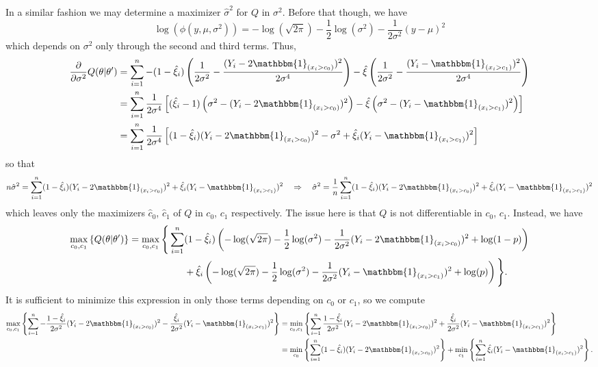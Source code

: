 \documentclass[10pt]{article}
\newcommand{\bp}[1]{\left({#1}\right)}
\newcommand{\1}[1]{\mathbbm{1}_{#1}}
\begin{document}
In a similar fashion we may determine a maximizer $\hat{\sigma}^2$ for $Q$ in $\sigma^2$. Before that though, we have 
\[\log(\phi(y,\mu,\sigma^2))=-\log(\sqrt{2\pi})-\frac{1}{2}\log(\sigma^2)-\frac{1}{2\sigma^2}(y-\mu)^2\]
which depends on $\sigma^2$ only through the second and third terms. Thus,
\begin{align*}
    \frac{\partial}{\partial\sigma^2}Q(\theta|\theta^\prime)&=\sum_{i=1}^n-(1-\hat{\xi}_i)\bp{\frac{1}{2\sigma^2}-\frac{(Y_i-2\mathbbm{1}_{(x_i>c_0)})^2}{2\sigma^4}}-\hat{\xi}\bp{\frac{1}{2\sigma^2}-\frac{(Y_i-\mathbbm{1}_{(x_i>c_1)})^2}{2\sigma^4}}\\
    &=\sum_{i=1}^n\frac{1}{2\sigma^4}\left[(\hat{\xi}_i-1)\bp{\sigma^2-(Y_i-2\mathbbm{1}_{(x_i>c_0)})^2}-\hat{\xi}\bp{\sigma^2-(Y_i-\mathbbm{1}_{(x_i>c_1)})^2}\right]\\
    &=\sum_{i=1}^n\frac{1}{2\sigma^4}\left[(1-\hat{\xi}_i)(Y_i-2\mathbbm{1}_{(x_i>c_0)})^2-\sigma^2+\hat{\xi}_i(Y_i-\mathbbm{1}_{(x_i>c_1)})^2\right]
\end{align*}
so that
\begin{align*}
    n\hat{\sigma}^2=\sum_{i=1}^n(1-\hat{\xi}_i)(Y_i-2\mathbbm{1}_{(x_i>c_0)})^2+\hat{\xi}_i(Y_i-\mathbbm{1}_{(x_i>c_1)})^2\quad\Rightarrow\quad\hat{\sigma}^2=\frac{1}{n}\sum_{i=1}^n(1-\hat{\xi}_i)(Y_i-2\mathbbm{1}_{(x_i>c_0)})^2+\hat{\xi}_i(Y_i-\mathbbm{1}_{(x_i>c_1)})^2
\end{align*}
which leaves only the maximizers $\hat{c}_0$, $\hat{c}_1$ of $Q$ in $c_0$, $c_1$ respectively. The issue here is that $Q$ is not differentiable in $c_0$, $c_1$. Instead, we have
\begin{align*}
    \max_{c_0,c_1}\left\{Q(\theta|\theta^\prime)\right\}=\max_{c_0,c_1}\Bigg\{\sum_{i=1}^n&(1-\hat{\xi}_i)\bp{-\log(\sqrt{2\pi})-\frac{1}{2}\log(\sigma^2)-\frac{1}{2\sigma^2}(Y_i-2\mathbbm{1}_{(x_i>c_0)})^2+\log(1-p)}\\
    &+\hat{\xi}_i\bp{-\log(\sqrt{2\pi})-\frac{1}{2}\log(\sigma^2)-\frac{1}{2\sigma^2}(Y_i-\mathbbm{1}_{(x_i>c_1)})^2+\log(p)}\Bigg\}.
\end{align*}
It is sufficient to minimize this expression in only those terms depending on $c_0$ or $c_1$, so we compute
\begin{align*}
    \max_{c_0,c_1}\left\{\sum_{i=1}^n-\frac{1-\hat{\xi}_i}{2\sigma^2}(Y_i-2\mathbbm{1}_{(x_i>c_0)})^2-\frac{\hat{\xi}_i}{2\sigma^2}(Y_i-\mathbbm{1}_{(x_i>c_1)})^2\right\}&=\min_{c_0,c_1}\left\{\sum_{i=1}^n\frac{1-\hat{\xi}_i}{2\sigma^2}(Y_i-2\mathbbm{1}_{(x_i>c_0)})^2+\frac{\hat{\xi}_i}{2\sigma^2}(Y_i-\mathbbm{1}_{(x_i>c_1)})^2\right\}\\
    &=\min_{c_0}\left\{\sum_{i=1}^n(1-\hat{\xi}_i)(Y_i-2\mathbbm{1}_{(x_i>c_0)})^2\right\}+\min_{c_1}\left\{\sum_{i=1}^n\hat{\xi}_i(Y_i-\mathbbm{1}_{(x_i>c_1)})^2\right\}.
\end{align*} 
\end{document}
